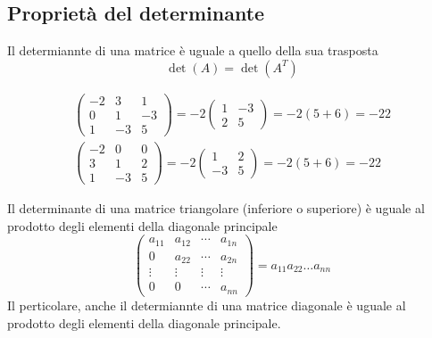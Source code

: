 \subsection{Proprietà del determinante}
\label{sec:prodeldet}
\begin{pro}
  \label{pro:prodeldet1}
  Il determiannte di una matrice è uguale a quello della sua trasposta
  \begin{equation*}
    \det(A)=\det(A^T)
  \end{equation*}
\end{pro}
\begin{es}
  \label{es:prodeldet1}
  \begin{eqnarray*}
    \begin{pmatrix}
      -2 & 3 & 1\\
      0 & 1 & -3\\
      1 & -3 & 5
    \end{pmatrix}=-2
    \begin{pmatrix}
      1 &-3\\
      2 & 5
    \end{pmatrix}= -2(5+6)=-22\\
    \begin{pmatrix}
      -2 & 0 & 0\\
      3 & 1 & 2 \\
      1 & -3 & 5
    \end{pmatrix}= -2
    \begin{pmatrix}
      1 & 2\\
      -3 & 5
    \end{pmatrix}=-2(5+6)=-22
  \end{eqnarray*}
\end{es}
\begin{pro}
  \label{pro:prodeldet2}
  Il determinante di una matrice triangolare (inferiore o superiore) è
  uguale al prodotto degli elementi della diagonale principale
  \begin{equation*}
    \begin{pmatrix}
      a_{11} & a_{12} & \cdots & a_{1n}\\
      0 & a_{22} & \cdots & a_{2n}\\
      \vdots & \vdots & \vdots & \vdots\\
      0 & 0 & \cdots & a_{nn}
    \end{pmatrix}=a_{11}a_{22}\dots a_{nn}
  \end{equation*}
  Il perticolare, anche il determiannte di una matrice diagonale è uguale
  al prodotto degli elementi della diagonale principale.
\end{pro}
